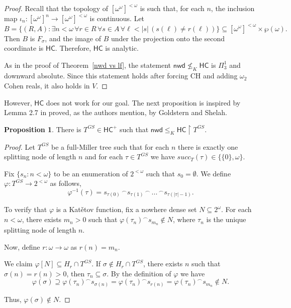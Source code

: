\documentclass{amsart}
\theoremstyle{definition}
\newtheorem{proposition}[theorem]{Proposition}
\theoremstyle{remark}
\numberwithin{equation}{section}
\newcommand{\nwd}{\mathsf{nwd}}
\newcommand{\hc}{\mathsf{HC}}
\newcommand{\restr}[2]{#1\upharpoonright {#2}}
\begin{document}
\begin{proof}
    Recall that the topology of $[\omega^\omega]^{<\omega}$ is such that, for each $n$, the inclusion map $\iota_n : [\omega^\omega]^n \to [\omega^\omega]^{<\omega}$ is continuous. Let
\[
B=\{(R,A): \exists n<\omega \,\forall r\in R \,\forall s\in A \,\forall \ell<|s| \,(s(\ell)\neq r(\ell))\}\subseteq [\omega^\omega]^{<\omega} \times \wp(\omega).
\]
    Then $B$ is $F_\sigma$, and the image of $B$ under the projection onto the second coordinate is $\hc$. Therefore, $\hc$ is analytic.

    As in the proof of Theorem~\ref{nwd vs lf}, the statement $\nwd\not\leq_K \hc$ is $\Pi^1_3$ and downward absolute. Since this statement holds after forcing $\mathrm{CH}$ and adding $\omega_2$ Cohen reals, it also holds in $V$.
\end{proof}



However, $\hc$ does not work for our goal. The next proposition is inspired by Lemma 2.7 in \cite{fullmil} proved, as the authors mention, by Goldstern and Shelah.

\begin{proposition}
    There is $T^{GS}\in\hc^+$ such that $\nwd\leq_K \restr{\hc}{T^{GS}}$.
\end{proposition}

\begin{proof}
    Let $T^{GS}$ be a full-Miller tree such that for each $n$ there is exactly one splitting node of length $n$ and for each $\tau\in T^{GS}$ we have $succ_T(\tau)\in \{\{0\},\omega\}$.
    
    Fix $\{s_n:n<\omega\}$ to be an enumeration of $2^{<\omega}$ such that $s_0=\emptyset$. We define $\varphi:T^{GS}\to2^{<\omega}$ as follows,
    \[
    \varphi^{-1}(\tau)=s_{\tau(0)} \,^\frown s_{\tau(1)} \,^\frown \, ... \,^\frown s_{\tau(|\tau|-1)}.
    \]

    To verify that $\varphi$ is a Kat\v{e}tov function, fix a nowhere dense set $N\subseteq 2^{\omega}$. For each $n<\omega$, there exists $m_n>0$ such that $\varphi(\tau_n)^\frown s_{m_n}\notin N$, where $\tau_n$ is the unique splitting node of length $n$.

    Now, define $r:\omega\rightarrow\omega$ as $r(n)=m_n$.
    
    We claim  $\varphi[N]\subseteq H_r\cap T^{GS}$. If $\sigma\notin H_r\cap T^{GS}$, there exists $n$ such that $\sigma(n)=r(n)>0$, then $\tau_n\subseteq \sigma$. By the definition of  $\varphi$ we have 
        \[
        \varphi(\sigma)\supseteq \varphi(\tau_n)^\frown s_{\sigma(n)}= \varphi(\tau_n)^\frown s_{r(n)}= \varphi(\tau_n)^\frown s_{m_n} \notin N.
        \]

    Thus, $\varphi(\sigma)\notin N$.
\end{proof}
\end{document}
